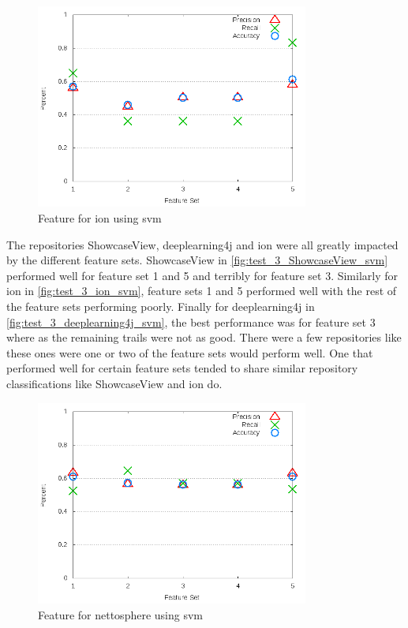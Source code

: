 \begin{figure}[!ht]
    \centering
        \includegraphics[width=0.8\textwidth]{images/svm/test_3/ion_sample_range}
        \caption{Feature for ion using \gls{svm}}
        \label{fig:test_3_ion_svm}
\end{figure}

The repositories ShowcaseView, deeplearning4j and ion were all greatly impacted by the different feature sets. ShowcaseView in \autoref{fig:test_3_ShowcaseView_svm} performed well for feature set 1 and 5 and terribly for feature set 3. 
Similarly for ion in \autoref{fig:test_3_ion_svm}, feature sets 1 and 5 performed well with the rest of the feature sets performing poorly. Finally for deeplearning4j in \autoref{fig:test_3_deeplearning4j_svm}, the best performance was for feature set 3 where as the remaining trails were not as good. There were a few repositories like these ones were one or two of the feature sets would perform well. One that performed well for certain feature sets tended to share similar repository classifications like ShowcaseView and ion do.

\begin{figure}[!ht]
    \centering
        \includegraphics[width=0.8\textwidth]{images/svm/test_3/nettosphere_sample_range}
        \caption{Feature for nettosphere using \gls{svm}}
        \label{fig:test_3_nettosphere_svm}
\end{figure}

